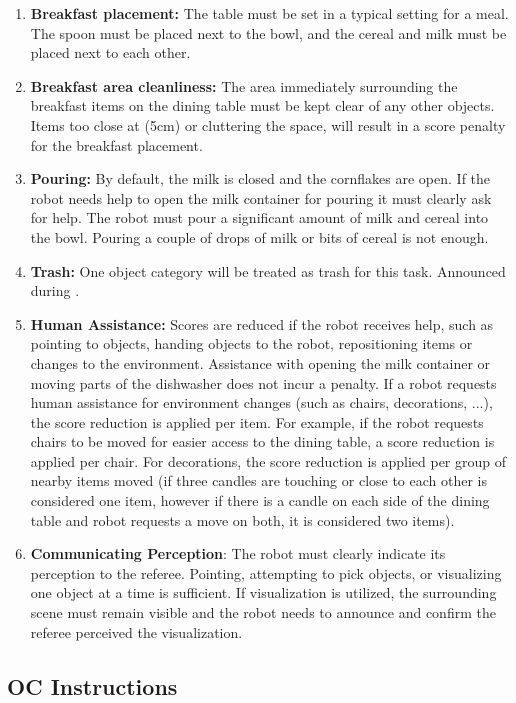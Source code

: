 \begin{enumerate}[nosep]
	\item \textbf{Breakfast placement:} The table must be set in a typical setting for a meal. The spoon must be placed next to the bowl, and the cereal and milk must be placed next to each other. 
	\item \textbf{Breakfast area cleanliness:} The area immediately surrounding the breakfast items on the dining table must be kept clear of any other objects. Items too close at (5cm) or cluttering the space, will result in a score penalty for the breakfast placement.
	\item \textbf{Pouring:} By default, the milk is closed and the cornflakes are open. If the robot needs help to open the milk container for pouring it must clearly ask for help. The robot must pour a significant amount of milk and cereal into the bowl. Pouring a couple of drops of milk or bits of cereal is not enough.
	\item \textbf{Trash:} One object category will be treated as trash for this task. Announced during \SetupDays{}.
	\item \textbf{Human Assistance:} Scores are reduced if the robot receives help, such as pointing to objects, handing objects to the robot, repositioning items or changes to the environment. Assistance with opening the milk container or moving parts of the dishwasher does not incur a penalty.
	If a robot requests human assistance for environment changes (such as chairs, decorations, ...), the score reduction is applied per item. For example, if the robot requests chairs to be moved for easier access to the dining table, a score reduction is applied per chair. For decorations, the score reduction is applied per group of nearby items moved (if three candles are touching or close to each other is considered one item, however if there is a candle on each side of the dining table and robot requests a move on both, it is considered two items).
	\item \textbf{Communicating Perception}: The robot must clearly indicate its perception to the referee. Pointing, attempting to pick objects, or visualizing one object at a time is sufficient. If visualization is utilized, the surrounding scene must remain visible and the robot needs to announce and confirm the referee perceived the visualization.
\end{enumerate}

\subsection*{OC Instructions}

